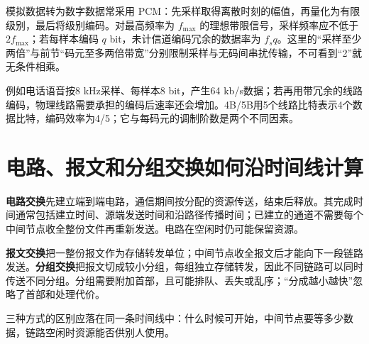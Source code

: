 模拟数据转为数字数据常采用 PCM：先采样取得离散时刻的幅值，再量化为有限级别，最后将级别编码。对最高频率为 \(f_{\max}\) 的理想带限信号，采样频率应不低于 \(2f_{\max}\)；若每样本编码 \(q\) bit，未计信道编码冗余的数据率为 \(f_s q\)。这里的``采样至少两倍''与前节``码元至多两倍带宽''分别限制采样与无码间串扰传输，不可看到``2''就无条件相乘。

例如电话语音按8 kHz采样、每样本8 bit，产生64 kb/s数据；若再用带冗余的线路编码，物理线路需要承担的编码后速率还会增加。4B/5B用5个线路比特表示4个数据比特，编码效率为4/5；它与每码元的调制阶数是两个不同因素。

\section{电路、报文和分组交换如何沿时间线计算}\label{cn-02-04}

\textbf{电路交换}先建立端到端电路，通信期间按分配的资源传送，结束后释放。其完成时间通常包括建立时间、源端发送时间和沿路径传播时间；已建立的通道不需要每个中间节点收全整份文件再重新发送。电路在空闲时仍可能保留资源。

\textbf{报文交换}把一整份报文作为存储转发单位；中间节点收全报文后才能向下一段链路发送。\textbf{分组交换}把报文切成较小分组，每组独立存储转发，因此不同链路可以同时传送不同分组。分组需要附加首部，且可能排队、丢失或乱序；``分成越小越快''忽略了首部和处理代价。

三种方式的区别应落在同一条时间线中：什么时候可开始，中间节点要等多少数据，链路空闲时资源能否供别人使用。

